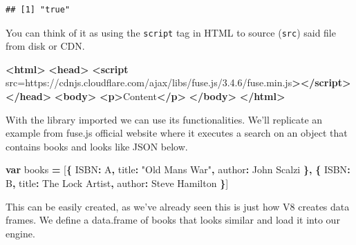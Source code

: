 \documentclass[
]{krantz}
\makeatletter
\newenvironment{Shaded}{\begin{snugshade}}{\end{snugshade}}
\newcommand{\KeywordTok}[1]{\textcolor[rgb]{0.27,0.27,0.27}{\textbf{#1}}}
\newcommand{\NormalTok}[1]{#1}
\newcommand{\OperatorTok}[1]{\textcolor[rgb]{0.43,0.43,0.43}{\textbf{#1}}}
\newcommand{\OtherTok}[1]{\textcolor[rgb]{0.37,0.37,0.37}{#1}}
\newcommand{\StringTok}[1]{\textcolor[rgb]{0.5,0.5,0.5}{#1}}
\newenvironment{kframe}{%
\medskip{}
\setlength{\fboxsep}{.8em}
 \def\at@end@of@kframe{}%
 \ifinner\ifhmode%
  \def\at@end@of@kframe{\end{minipage}}%
  \begin{minipage}{\columnwidth}%
 \fi\fi%
 \def\FrameCommand##1{\hskip\@totalleftmargin \hskip-\fboxsep
 \colorbox{shadecolor}{##1}\hskip-\fboxsep
     \hskip-\linewidth \hskip-\@totalleftmargin \hskip\columnwidth}%
 \MakeFramed {\advance\hsize-\width
   \@totalleftmargin\z@ \linewidth\hsize
   \@setminipage}}%
 {\par\unskip\endMakeFramed%
 \at@end@of@kframe}
\renewenvironment{Shaded}{\begin{kframe}}{\end{kframe}}
\makeatother
\begin{document}
\begin{verbatim}
## [1] "true"
\end{verbatim}

You can think of it as using the \texttt{script} tag in HTML to source (\texttt{src}) said file from disk or CDN.

\begin{Shaded}
\begin{Highlighting}[]
\KeywordTok{<html>}
  \KeywordTok{<head>}
    \KeywordTok{<script}\OtherTok{ src=}\StringTok{\textquotesingle{}https://cdnjs.cloudflare.com/ajax/libs/fuse.js/3.4.6/fuse.min.js\textquotesingle{}}\KeywordTok{></script>}
  \KeywordTok{</head>}
  \KeywordTok{<body>}
    \KeywordTok{<p>}\NormalTok{Content}\KeywordTok{</p>}
  \KeywordTok{</body>}
\KeywordTok{</html>}
\end{Highlighting}
\end{Shaded}

With the library imported we can use its functionalities. We'll replicate an example from fuse.js official website where it executes a search on an object that contains books and looks like JSON below.

\begin{Shaded}
\begin{Highlighting}[]
\KeywordTok{var}\NormalTok{ books }\OperatorTok{=}\NormalTok{ [}\OperatorTok{\{}
  \StringTok{\textquotesingle{}ISBN\textquotesingle{}}\OperatorTok{:} \StringTok{\textquotesingle{}A\textquotesingle{}}\OperatorTok{,}
  \StringTok{\textquotesingle{}title\textquotesingle{}}\OperatorTok{:} \StringTok{"Old Man\textquotesingle{}s War"}\OperatorTok{,}
  \StringTok{\textquotesingle{}author\textquotesingle{}}\OperatorTok{:} \StringTok{\textquotesingle{}John Scalzi\textquotesingle{}}
\OperatorTok{\},} \OperatorTok{\{}
  \StringTok{\textquotesingle{}ISBN\textquotesingle{}}\OperatorTok{:} \StringTok{\textquotesingle{}B\textquotesingle{}}\OperatorTok{,}
  \StringTok{\textquotesingle{}title\textquotesingle{}}\OperatorTok{:} \StringTok{\textquotesingle{}The Lock Artist\textquotesingle{}}\OperatorTok{,}
  \StringTok{\textquotesingle{}author\textquotesingle{}}\OperatorTok{:} \StringTok{\textquotesingle{}Steve Hamilton\textquotesingle{}}
\OperatorTok{\}}\NormalTok{]}
\end{Highlighting}
\end{Shaded}

This can be easily created, as we've already seen this is just how V8 creates data frames. We define a data.frame of books that looks similar and load it into our engine.
\end{document}
